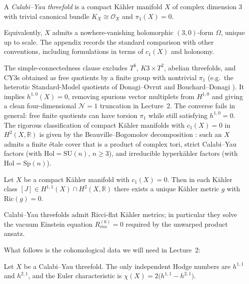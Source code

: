 \begin{definition}\label{def:CY3}
A \emph{Calabi--Yau threefold} is a compact K\"ahler manifold $X$ of
complex dimension $3$ with trivial canonical bundle
$K_X\cong\mathcal{O}_X$ and $\pi_1(X)=0$.
\end{definition}

Equivalently, $X$ admits a nowhere-vanishing holomorphic
$(3,0)$-form $\Omega$, unique up to scale. The appendix records the
standard comparison with other conventions, including formulations in
terms of $c_1(X)$ and holonomy.

The simple-connectedness clause excludes $T^6$, $K3\times T^2$,
abelian threefolds, and CY3s obtained as free quotients by a
finite group with nontrivial $\pi_1$ (e.g.\ the heterotic
Standard-Model quotients of Donagi--Ovrut \cite{DonagiOvrut:2000}
and Bouchard--Donagi \cite{BouchardDonagi:2005}). It implies
$h^{1,0}(X)=0$, removing spurious vector multiplets from
$H^{1,0}$ and giving a clean four-dimensional $\mathcal{N}=1$
truncation in Lecture~2. The converse fails in general: free
finite quotients can have torsion $\pi_1$ while still satisfying
$h^{1,0}=0$. The rigorous classification of compact K\"ahler
manifolds with $c_1(X)=0$ in $H^2(X,\mathbb{R})$ is given by the
Beauville--Bogomolov decomposition \cite{Beauville:1983,Joyce:2000}:
such an $X$ admits a finite \'etale cover that is a product of
complex tori, strict Calabi--Yau factors (with
$\mathrm{Hol}=\mathrm{SU}(n)$, $n\geq 3$), and irreducible
hyperk\"ahler factors (with $\mathrm{Hol}=\mathrm{Sp}(n)$).

\begin{theorem}\label{thm:yau}
Let $X$ be a compact K\"ahler manifold with $c_1(X)=0$. Then in each
K\"ahler class $[J]\in H^{1,1}(X)\cap H^2(X,\mathbb{R})$ there exists
a unique K\"ahler metric $g$ with $\mathrm{Ric}(g)=0$.
\end{theorem}

\begin{corollary}\label{cor:CY-Ricci}
Calabi--Yau threefolds admit Ricci-flat K\"ahler metrics; in
particular they solve the vacuum Einstein equation
$R_{mn}^{(6)} = 0$ required by the unwarped product ansatz.
\end{corollary}

What follows is the cohomological data we will need in Lecture~2:

\begin{proposition}
Let $X$ be a Calabi--Yau threefold. The only independent Hodge numbers are $h^{1,1}$ and $h^{2,1}$, and the Euler characteristic is $\chi(X) = 2\bigl(h^{1,1}-h^{2,1}\bigr)$.
\end{proposition}

